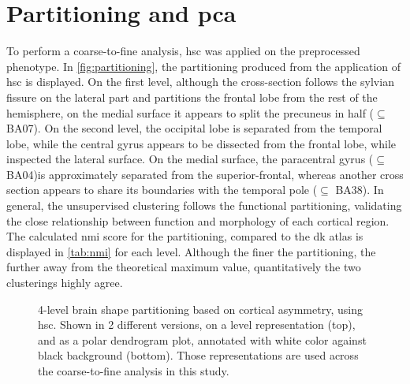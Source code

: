 \section{Partitioning and \acs{pca}}

To perform a coarse-to-fine analysis,  \ac{hsc} was applied on the preprocessed phenotype. In \autoref{fig:partitioning}, the partitioning produced from the application of \ac{hsc} is displayed. On the first level, although the cross-section follows the sylvian fissure on the lateral part and partitions the frontal lobe from the rest of the hemisphere, on the medial surface it appears to split the precuneus in half ($\subseteq$ BA07). On the second level, the occipital lobe is separated from the temporal lobe, while the central gyrus appears to be dissected from the frontal lobe, while inspected the lateral surface. On the medial surface, the paracentral gyrus ($\subseteq$ BA04)is approximately separated from the superior-frontal, whereas another cross section appears to share its boundaries with the temporal pole ($\subseteq$ BA38). In general, the unsupervised clustering follows the functional partitioning, validating the close relationship  between function and morphology of each cortical region. The calculated \ac{nmi} score for the partitioning, compared to the \ac{dk} atlas is displayed in \autoref{tab:nmi} for each level. Although the finer the partitioning, the further away from the theoretical maximum value, quantitatively the two clusterings highly agree.

\begin{figure}[H]
	\begin{adjustwidth}{-4cm}{-4cm}
	\centering
	\subfloat[]{
		
	}\quad
	\subfloat[]{
		
	}

\end{adjustwidth}
\caption[4-level brain shape partitioning based on asymmetry]{4-level brain shape partitioning based on cortical asymmetry, using \ac{hsc}. Shown in 2 different versions, on a level representation (top), and as a polar dendrogram plot, annotated with white color against black background (bottom). Those representations are used across the coarse-to-fine analysis in this study.}
\label{fig:partitioning}
\end{figure}

